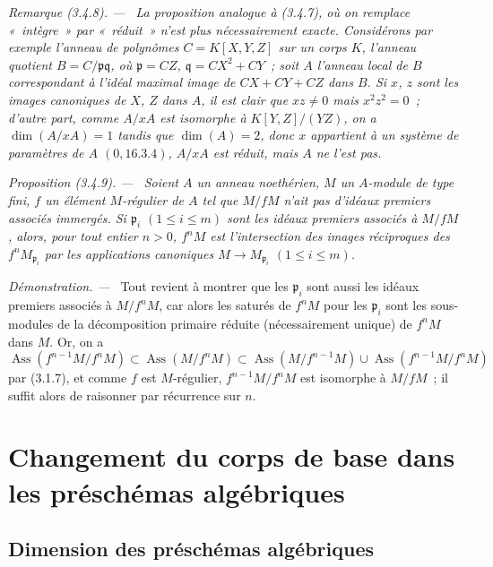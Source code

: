 \documentclass[10pt,oneside]{book}
\newcommand{\oldpage}[2][]{%
  \setcounter{footnote}{0}%
  \marginpar{\scriptsize\textbf{#1}~|~#2}\ignorespaces}
\newenvironment{proposition}[1][]{%
  \par\medskip\noindent\itshape Proposition (#1). ---\ }{\par}
\newenvironment{remark}[1][]{%
  \par\medskip\noindent\itshape Remarque (#1). ---\ }{\par}
\newenvironment{proof}{%
  \par\medskip\noindent\textit{Démonstration. ---\ }}{\par}
\begin{document}
\begin{remark}[3.4.8]
\label{IV.2.3.4.8-fr}
La proposition analogue à (3.4.7), où on remplace «~intègre~» par
«~réduit~» n'est plus nécessairement exacte. Considérons par exemple l'anneau
de polynômes $C=K[X,Y,Z]$ sur un corps $K$, l'anneau quotient
$B=C/\mathfrak p\mathfrak q$, où $\mathfrak p=CZ$,
$\mathfrak q=CX^2+CY$~; soit $A$ l'anneau local de $B$ correspondant à l'idéal
maximal image de $CX+CY+CZ$ dans $B$. Si $x$, $z$ sont les images canoniques
de $X$, $Z$ dans $A$, il est clair que $xz\neq0$ mais $x^2z^2=0$~; d'autre
part, comme $A/xA$ est isomorphe à $K[Y,Z]/(YZ)$, on a
$\dim(A/xA)=1$ tandis que $\dim(A)=2$, donc $x$ appartient à un système de
paramètres de $A$ $(0,16.3.4)$, $A/xA$ est réduit, mais $A$ ne l'est pas.
\end{remark}

\begin{proposition}[3.4.9]
\label{IV.2.3.4.9-fr}
Soient $A$ un anneau noethérien, $M$ un $A$-module de type fini, $f$ un
élément $M$-régulier de $A$ tel que $M/fM$ n'ait pas d'idéaux premiers
associés immergés. Si $\mathfrak p_i$ $(1\leqslant i\leqslant m)$ sont les
idéaux premiers associés à $M/fM$, alors, pour tout entier $n>0$, $f^nM$ est
l'intersection des images réciproques des $f^nM_{\mathfrak p_i}$ par les
applications canoniques $M\to M_{\mathfrak p_i}$ $(1\leqslant i\leqslant m)$.
\end{proposition}

\begin{proof}
Tout revient à montrer que les $\mathfrak p_i$ sont aussi les idéaux premiers
associés à $M/f^nM$, car alors les saturés de $f^nM$ pour les
$\mathfrak p_i$ sont les sous-modules de la décomposition primaire réduite
(nécessairement unique) de $f^nM$ dans $M$. Or, on a
\[
\operatorname{Ass}(f^{n-1}M/f^nM)
\subset\operatorname{Ass}(M/f^nM)
\subset\operatorname{Ass}(M/f^{n-1}M)
\cup\operatorname{Ass}(f^{n-1}M/f^nM)
\]
par (3.1.7), et comme $f$ est $M$-régulier,
$f^{n-1}M/f^nM$ est isomorphe à $M/fM$~; il suffit alors de raisonner par
récurrence sur $n$.
\end{proof}
\oldpage[IV-2]{52}

\section{Changement du corps de base dans les préschémas algébriques}
\label{IV.2.4-fr}

\subsection{Dimension des préschémas algébriques}
\label{subsection:IV.2.4.1-fr}
\end{document}
